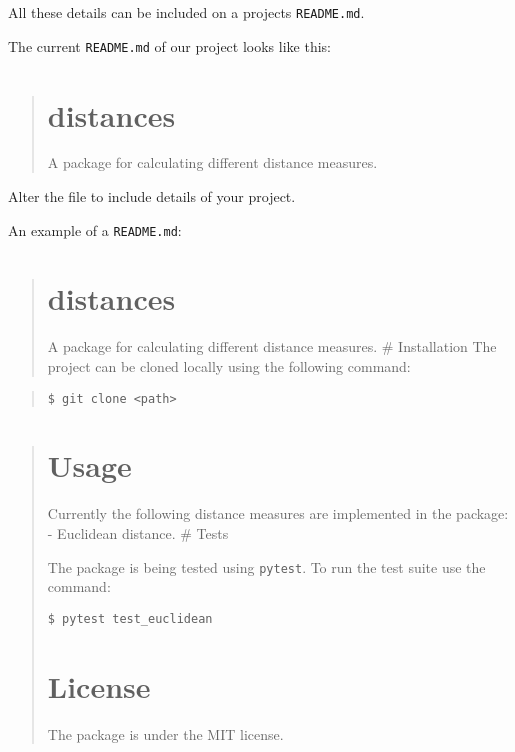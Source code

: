 \documentclass[11pt]{article}
\begin{document}
All these details can be included on a projects \texttt{README.md}.

The current \texttt{README.md} of our project looks like this:

\begin{quote}
\hypertarget{distances}{%
\section{distances}\label{distances}}

A package for calculating different distance measures.
\end{quote}

Alter the file to include details of your project.

An example of a \texttt{README.md}:

\begin{quote}
\hypertarget{distances-1}{%
\section{distances}\label{distances-1}}

A package for calculating different distance measures. \# Installation
The project can be cloned locally using the following command:
\end{quote}

\begin{quote}
\begin{verbatim}
$ git clone <path>
\end{verbatim}
\end{quote}

\begin{quote}
\hypertarget{usage}{%
\section{Usage}\label{usage}}

Currently the following distance measures are implemented in the
package: - Euclidean distance. \# Tests

The package is being tested using \texttt{pytest}. To run the test suite
use the command:

\begin{verbatim}
$ pytest test_euclidean
\end{verbatim}

\hypertarget{license}{%
\section{License}\label{license}}

The package is under the MIT license.
\end{quote}
\end{document}
